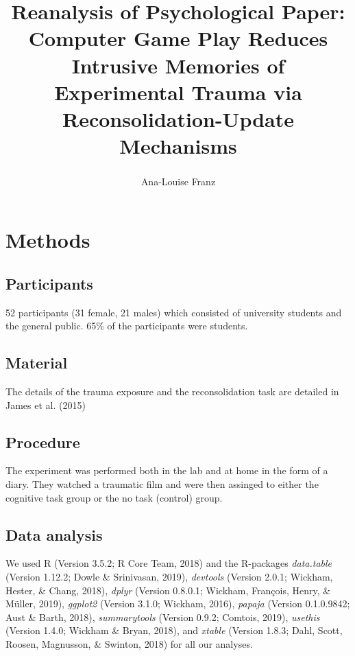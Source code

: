 \documentclass[man]{apa6}
\title{Reanalysis of Psychological Paper: Computer Game Play Reduces Intrusive
Memories of Experimental Trauma via Reconsolidation-Update Mechanisms}
\author{Ana-Louise Franz\textsuperscript{}}
\date{}
\affiliation{
\vspace{0.5cm}
\textsuperscript{1} Brooklyn College}
\begin{document}
\maketitle

\section{Methods}\label{methods}

\subsection{Participants}\label{participants}

52 participants (31 female, 21 males) which consisted of university
students and the general public. 65\% of the participants were students.

\subsection{Material}\label{material}

The details of the trauma exposure and the reconsolidation task are
detailed in James et al. (2015)

\subsection{Procedure}\label{procedure}

The experiment was performed both in the lab and at home in the form of
a diary. They watched a traumatic film and were then assinged to either
the cognitive task group or the no task (control) group.

\subsection{Data analysis}\label{data-analysis}

We used R (Version 3.5.2; R Core Team, 2018) and the R-packages
\emph{data.table} (Version 1.12.2; Dowle \& Srinivasan, 2019),
\emph{devtools} (Version 2.0.1; Wickham, Hester, \& Chang, 2018),
\emph{dplyr} (Version 0.8.0.1; Wickham, François, Henry, \& Müller,
2019), \emph{ggplot2} (Version 3.1.0; Wickham, 2016), \emph{papaja}
(Version 0.1.0.9842; Aust \& Barth, 2018), \emph{summarytools} (Version
0.9.2; Comtois, 2019), \emph{usethis} (Version 1.4.0; Wickham \& Bryan,
2018), and \emph{xtable} (Version 1.8.3; Dahl, Scott, Roosen, Magnusson,
\& Swinton, 2018) for all our analyses.
\end{document}
